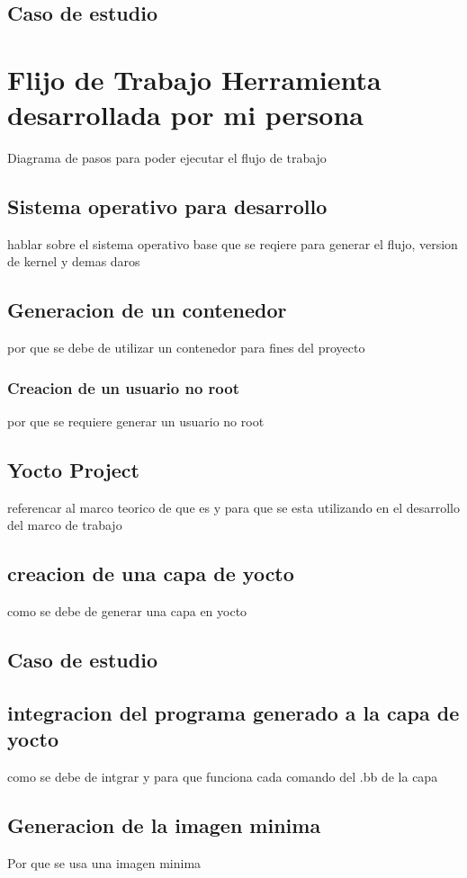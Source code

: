 \subsection{Caso de estudio}


\section{Flijo de Trabajo Herramienta desarrollada por mi persona}
Diagrama de pasos para poder ejecutar el flujo de trabajo

\subsection{Sistema operativo para desarrollo}
hablar sobre el sistema operativo base que se reqiere para generar el flujo, version de kernel y demas daros 

\subsection{Generacion de un contenedor}
por que se debe de utilizar un contenedor para fines del proyecto
\subsubsection{Creacion de un usuario no root}
por que se requiere generar un usuario no root 
\subsection{Yocto Project}
referencar al marco teorico de que es y para que se esta utilizando en el desarrollo del marco de trabajo
\subsection{creacion de una capa de yocto}
como se debe de generar una capa en yocto
\subsection{Caso de estudio}
\subsection{integracion del programa generado a la capa de yocto}
como se debe de intgrar y para que funciona cada comando del .bb de la capa
\subsection{Generacion de la imagen minima}
Por que se usa una imagen minima 
